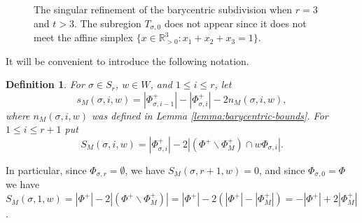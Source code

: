 \documentclass[12pt]{amsart}
\newtheorem{definition}[theorem]{Definition}
\theoremstyle{remark}
\newcommand{\R}{\mathbb R}
\begin{document}
\begin{figure}[ht]
\centering
{}

\caption{The singular refinement of the barycentric subdivision when $r=3$ and $t>3$. The subregion $T_{\sigma,0}$ does not appear since it does not meet the affine simplex $\{x\in \R_{>0}^3: x_1+x_2+x_3=1\}$.}
\end{figure}



It will be convenient to introduce the following notation.

\begin{definition}\label{def:s-and-S}
For $\sigma\in S_r$, $w\in W$, and $1\le i\le r$, let
\[
s_M(\sigma, i, w)= |\Phi_{\sigma, i-1}^+| - |\Phi_{\sigma, i}^+| - 2n_M(\sigma, i, w),
\]
where $n_M(\sigma,i,w)$ was defined in Lemma \ref{lemma:barycentric-bounds}. For $1\le i\le r+1$ put
\[
S_M(\sigma, i, w) = |\Phi_{\sigma, i}^+| - 2|(\Phi^+ \smallsetminus \Phi^+_M) \cap w \Phi_{\sigma, i}|.
\]
\end{definition}


In particular, since $\Phi_{\sigma,r}=\emptyset$, we have $S_M(\sigma, r+1, w)=0$, and since $\Phi_{\sigma,0}=\Phi$ we have $S_M(\sigma, 1, w)=|\Phi^+| - 2|(\Phi^+ \smallsetminus \Phi^+_M)|=|\Phi^+| - 2(|\Phi^+| -|\Phi^+_M|)=-|\Phi^+| + 2|\Phi^+_M|$.
\end{document}
